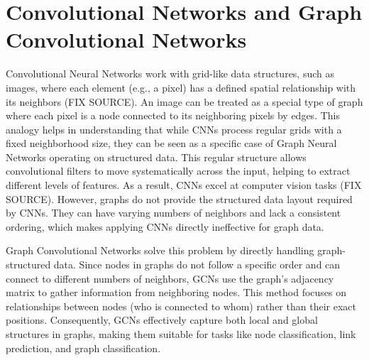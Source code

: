 \section{Convolutional Networks and Graph Convolutional Networks}
Convolutional Neural Networks work with grid-like data structures, such as images, where each element (e.g., a pixel) has a defined spatial relationship with its neighbors (FIX SOURCE). An image can be treated as a special type of graph where each pixel is a node connected to its neighboring pixels by edges. This analogy helps in understanding that while CNNs process regular grids with a fixed neighborhood size, they can be seen as a specific case of Graph Neural Networks operating on structured data. This regular structure allows convolutional filters to move systematically across the input, helping to extract different levels of features. As a result, CNNs excel at computer vision tasks (FIX SOURCE). However, graphs do not provide the structured data layout required by CNNs. They can have varying numbers of neighbors and lack a consistent ordering, which makes applying CNNs directly ineffective for graph data.

Graph Convolutional Networks solve this problem by directly handling graph-structured data. Since nodes in graphs do not follow a specific order and can connect to different numbers of neighbors, GCNs use the graph's adjacency matrix to gather information from neighboring nodes. This method focuses on relationships between nodes (who is connected to whom) rather than their exact positions. Consequently, GCNs effectively capture both local and global structures in graphs, making them suitable for tasks like node classification, link prediction, and graph classification.


